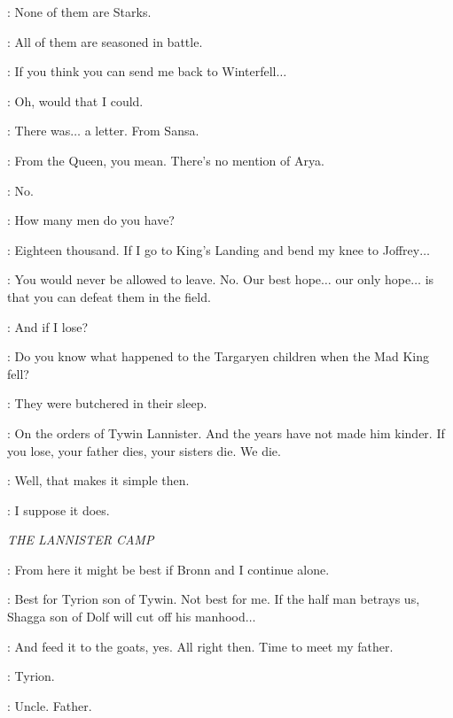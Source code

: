 \ROBB: None of them are Starks. 

\CATELYN: All of them are seasoned in battle. 

\ROBB: If you think you can send me back to Winterfell$\ldots$  

\CATELYN: Oh, would that I could. 

\ROBB: There was$\ldots$ a letter. From Sansa. 

\CATELYN: From the Queen, you mean.  There's no mention of Arya. 

\ROBB: No. 

\CATELYN: How many men do you have? 

\ROBB: Eighteen thousand. If I go to King's Landing and bend my knee to Joffrey$\ldots$  

\CATELYN: You would never be allowed to leave. No. Our best hope$\ldots$ our only hope$\ldots$ is that you can defeat them in the field. 

\ROBB: And if I lose? 

\CATELYN: Do you know what happened to the Targaryen children when the Mad King fell?

\ROBB: They were butchered in their sleep.

\CATELYN: On the orders of Tywin Lannister. And the years have not made him kinder. If you lose, your father dies, your sisters die. We die. 

\ROBB: Well, that makes it simple then. 

\CATELYN: I suppose it does. 


\scene

\textit{THE LANNISTER CAMP} 


\TYRION: From here it might be best if Bronn and I continue alone. 

\SHAGGA: Best for Tyrion son of Tywin. Not best for me. If the half man betrays us, Shagga son of Dolf will cut off his manhood$\ldots$  

\TYRION: And feed it to the goats, yes. All right then. Time to meet my father. 


\KEVAN: Tyrion. 

\TYRION: Uncle. Father. 

